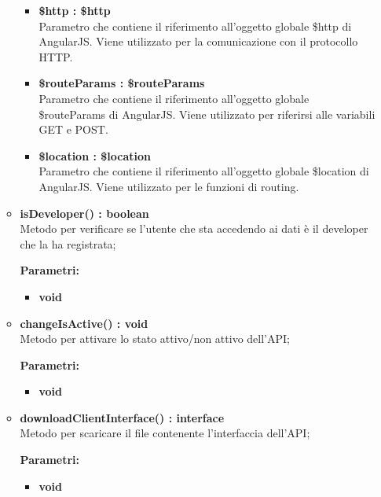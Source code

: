 \begin{itemize}
\begin{itemize}
\begin{itemize}
			\item \textbf{\$http : \$http}\\
			Parametro che contiene il riferimento all'oggetto globale \$http di AngularJS. Viene utilizzato per la comunicazione con il protocollo HTTP.
			
			\item \textbf{\$routeParams : \$routeParams}\\
			Parametro che contiene il riferimento all'oggetto globale \$routeParams di AngularJS. Viene utilizzato per riferirsi alle variabili GET e POST.
			
			\item \textbf{\$location : \$location}\\
			Parametro che contiene il riferimento all'oggetto globale \$location di AngularJS. Viene utilizzato per le funzioni di routing.
			
		\end{itemize}		
		
		\item \textbf{isDeveloper() : boolean}\\
		Metodo per verificare se l'utente che sta accedendo ai dati è il developer che la ha registrata;
		\begin{description}
			\item[\textbf{Parametri:}]
		\end{description}
		\begin{itemize}
			\item \textbf{void}\\
		\end{itemize}		
		
		\item \textbf{changeIsActive() : void}\\
		Metodo per attivare lo stato attivo/non attivo dell'API;
		\begin{description}
			\item[\textbf{Parametri:}]
		\end{description}
		\begin{itemize}
			\item \textbf{void}\\
		\end{itemize}		
		
		\item \textbf{downloadClientInterface() : interface}\\
		Metodo per scaricare il file contenente l'interfaccia dell'API;
		\begin{description}
			\item[\textbf{Parametri:}]
		\end{description}
		\begin{itemize}
			\item \textbf{void}\\
		\end{itemize}		
		

\end{itemize}
\end{itemize}
